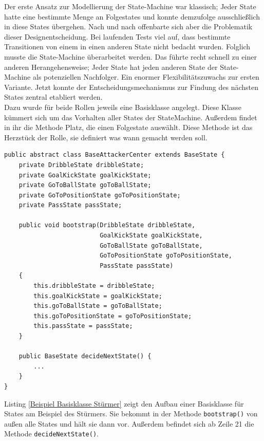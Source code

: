 \documentclass[fontsize=12pt,a4paper,final]{scrartcl}[2003/01/01]
\begin{document}
Der erste Ansatz zur Modellierung der State-Machine war klassisch; Jeder State hatte eine bestimmte Menge an Folgestates und konnte demzufolge ausschließlich in diese States übergehen. Nach und nach offenbarte sich aber die Problematik dieser Designentscheidung. Bei laufenden Tests viel auf, dass bestimmte Transitionen von einem in einen anderen State nicht bedacht wurden. Folglich musste die State-Machine überarbeitet werden. Das führte recht schnell zu einer anderen Herangehensweise; Jeder State hat jeden anderen State der State-Machine als potenziellen Nachfolger. Ein enormer Flexibilitätszuwachs zur ersten Variante. Jetzt konnte der Entscheidungsmechanismus zur Findung des nächsten States  zentral etabliert werden. 
\\

Dazu wurde für beide Rollen jeweils eine Basisklasse angelegt. Diese Klasse kümmert sich um das Vorhalten aller States der StateMachine. Außerdem findet in ihr die Methode Platz, die einen Folgestate auswählt. Diese Methode ist das Herzstück der Rolle, sie definiert was wann gemacht werden soll.
\\

\begin{lstlisting}[caption=Beispiel Basisklasse Stürmer, captionpos=b, label=Beispiel Basisklasse Stürmer]
public abstract class BaseAttackerCenter extends BaseState {
    private DribbleState dribbleState;
    private GoalKickState goalKickState;
    private GoToBallState goToBallState;
    private GoToPositionState goToPositionState;
    private PassState passState;

    public void bootstrap(DribbleState dribbleState, 
    					  GoalKickState goalKickState, 
    					  GoToBallState goToBallState, 
                          GoToPositionState goToPositionState, 
                          PassState passState) 
    {
        this.dribbleState = dribbleState;
        this.goalKickState = goalKickState;
        this.goToBallState = goToBallState;
        this.goToPositionState = goToPositionState;
        this.passState = passState;
    }

    public BaseState decideNextState() {
        ...
    }
}
\end{lstlisting}

Listing \ref{Beispiel Basisklasse Stürmer} zeigt den Aufbau einer Basisklasse für States am Beispiel des Stürmers. Sie bekommt in der Methode \lstinline$bootstrap()$ von außen alle States und hält sie dann vor. Außerdem befindet sich ab Zeile 21 die Methode \lstinline$decideNextState()$.
\end{document}
